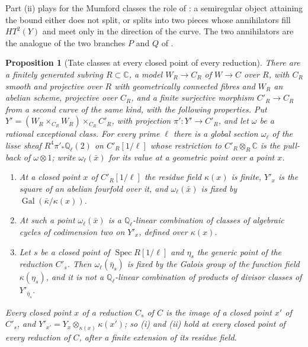 \documentclass[11pt,reqno]{amsart}
\theoremstyle{plain}
\newtheorem{proposition}[theorem]{Proposition}
\theoremstyle{definition}
\theoremstyle{remark}
\newcommand{\QQ}{\mathbb{Q}}
\newcommand{\CC}{\mathbb{C}}
\DeclareMathOperator{\Gal}{Gal}
\DeclareMathOperator{\Spec}{Spec}
\begin{document}
Part (ii) plays for the Mumford classes the role of : a
semiregular object attaining the bound either does not split, or splits into
two pieces whose annihilators fill $HT^{2}(Y)$ and meet only in the direction
of the curve. The two annihilators are the analogue of the two branches $P$
and $Q$ of \cite[Remark~2.10]{paperII}.

\begin{proposition}[Tate classes at every closed point of every reduction]
\label{prop:modp}
There are a finitely generated subring $R\subset\CC$, a model $W_{R}\to
C_{R}$ of $W\to C$ over $R$, with $C_{R}$ smooth and projective over $R$ with
geometrically connected fibres and $W_{R}$ an abelian scheme, projective over
$C_{R}$, and a finite surjective morphism $C'_{R}\to C_{R}$ from a second curve of the same
kind, with the following properties. Put $Y'=(W_{R}\times_{C_{R}}W_{R})
\times_{C_{R}}C'_{R}$, with projection $\pi'\colon Y'\to C'_{R}$, and let
$\omega$ be a rational exceptional class. For every prime $\ell$ there is a
global section $\omega_{\ell}$ of the lisse sheaf
$R^{4}\pi'_{*}\QQ_{\ell}(2)$ on $C'_{R}[1/\ell]$ whose restriction to
$C'_{R}\otimes_{R}\CC$ is the pull-back of $\omega\otimes1$; write
$\omega_{\ell}(\bar{x})$ for its value at a geometric point over a point $x$.
\begin{enumerate}[label=\textup{(\roman*)},leftmargin=2.6em,itemsep=2pt]
\item At a closed point $x$ of $C'_{R}[1/\ell]$ the residue field
  $\kappa(x)$ is finite, $Y'_{x}$ is the square of an abelian fourfold over
  it, and $\omega_{\ell}(\bar{x})$ is fixed by $\Gal(\bar{\kappa}/\kappa(x))$.
\item At such a point $\omega_{\ell}(\bar{x})$ is a $\QQ_{\ell}$-linear
  combination of classes of algebraic cycles of codimension two on $Y'_{x}$,
  defined over $\kappa(x)$.
\item Let $s$ be a closed point of $\Spec R[1/\ell]$ and $\eta_{s}$ the generic
  point of the reduction $C'_{s}$. Then $\omega_{\ell}(\bar\eta_{s})$ is fixed
  by the Galois group of the function field $\kappa(\eta_{s})$, and it is not
  a $\QQ_{\ell}$-linear combination of products of divisor classes of
  $Y'_{\bar\eta_{s}}$.
\end{enumerate}
Every closed point $x$ of a reduction $C_{s}$ of $C$ is the image of a closed
point $x'$ of $C'_{s}$, and $Y'_{x'}=Y_{x}\otimes_{\kappa(x)}\kappa(x')$; so
(i) and (ii) hold at every closed point of every reduction of $C$, after a
finite extension of its residue field.
\end{proposition}
\end{document}
